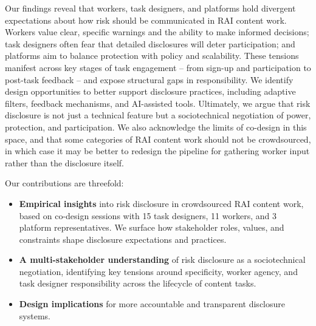 Our findings reveal that workers, task designers, and platforms hold divergent expectations about how risk should be communicated in RAI content work. Workers value clear, specific warnings and the ability to make informed decisions; task designers often fear that detailed disclosures will deter participation; and platforms aim to balance protection with policy and scalability. These tensions manifest across key stages of task engagement -- from sign-up and participation to post-task feedback -- and expose structural gaps in responsibility. We identify design opportunities to better support disclosure practices, including adaptive filters, feedback mechanisms, and AI-assisted tools. Ultimately, we argue that risk disclosure is not just a technical feature but a sociotechnical negotiation of power, protection, and participation. We also acknowledge the limits of co-design in this space, and that some categories of RAI content work should not be crowdsourced, in which case it may be better to redesign the pipeline for gathering worker input rather than the disclosure itself.

Our contributions are threefold:

\begin{itemize}
\item \textbf{Empirical insights} into risk disclosure in crowdsourced RAI content work, based on co-design sessions with 15 task designers, 11 workers, and 3 platform representatives. We surface how stakeholder roles, values, and constraints shape disclosure expectations and practices.
\item \textbf{A multi-stakeholder understanding} of risk disclosure as a sociotechnical negotiation, identifying key tensions around specificity, worker agency, and task designer responsibility across the lifecycle of content tasks.
\item \textbf{Design implications} for more accountable and transparent disclosure systems.

\end{itemize}
